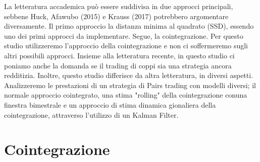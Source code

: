 \documentclass[]{article}
\begin{document}
La letteratura accademica può essere suddivisa in due approcci principali, sebbene Huck, Afawubo (2015) e Krauss (2017) potrebbero argomentare diversamente.
Il primo approccio  la distanza minima al quadrato (SSD), essendo uno dei primi approcci da implementare. Segue, la cointegrazione. Per questo studio utilizzeremo l'approccio della cointegrazione e non ci soffermeremo sugli altri possibili approcci. Insieme alla letteratura recente, in questo studio ci poniamo anche la domanda se il trading di coppi sia una strategia ancora redditizia. Inoltre, questo studio differisce da altra letteratura, in diversi aspetti. Analizzeremo  le prestazioni di un strategia di Pairs trading con modelli diversi; il normale approccio cointegrato, una stima "rolling" della cointegrazione conuna finestra bimestrale e un approccio di stima dinamica gionaliera della cointegrazione, attraverso l'utilizzo di un Kalman Filter.

\break 

\section{Cointegrazione}
\end{document}
